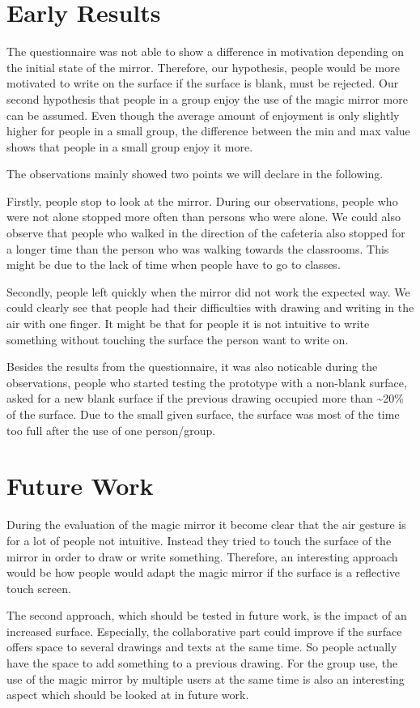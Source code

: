\section{Early Results}
The questionnaire was not able to show a difference in motivation depending on the initial state of the mirror. Therefore, our hypothesis, people would be more motivated to write on the surface if the surface is blank, must be rejected. Our second hypothesis that people in a group enjoy the use of the magic mirror more can be assumed. Even though the average amount of enjoyment is only slightly higher for people in a small group, the difference between the min and max value shows that people in a small group enjoy it more.

The observations mainly showed two points we will declare in the following. 

 Firstly, people stop to look at the mirror. During our observations, people who were not alone stopped more often than persons who were alone. We could also observe that people who walked in the direction of the cafeteria also stopped for a longer time than the person who was walking towards the classrooms. This might be due to the lack of time when people have to go to classes.

Secondly, people left quickly when the mirror did not work the expected way. We could clearly see that people had their difficulties with drawing and writing in the air with one finger. It might be that for people it is not intuitive to write something without touching the surface the person want to write on.

Besides the results from the questionnaire, it was also noticable during the observations, people who started testing the prototype with a non-blank surface, asked for a new blank surface if the previous drawing occupied more than \textasciitilde20\% of the surface. Due to the small given surface, the surface was most of the time too full after the use of one person/group.

\section{Future Work}
During the evaluation of the magic mirror it become clear that the air gesture is for a lot of people not intuitive. Instead they tried to touch the surface of the mirror in order to draw or write something. Therefore, an interesting approach would be how people would adapt the magic mirror if the surface is a reflective touch screen.

The second approach, which should be tested in future work, is the impact of an increased surface. Especially, the collaborative part could improve if the surface offers space to several drawings and texts at the same time. So people actually have the space to add something to a previous drawing. For the group use, the use of the magic mirror by multiple users at the same time is also an interesting aspect which should be looked at in future work.
